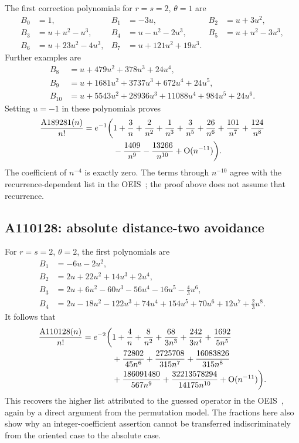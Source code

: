 \documentclass[11pt]{article}
\numberwithin{equation}{section}
\theoremstyle{definition}
\theoremstyle{remark}
\theoremstyle{definition}
\newcommand{\Aone}{\textnormal{A189281}}
\newcommand{\Atwo}{\textnormal{A110128}}
\newcommand{\bigO}{\mathrm O}
\begin{document}
The first correction polynomials for $r=s=2$, $\theta=1$ are
\begin{align}
 B_0&=1,& B_1&=-3u,& B_2&=u+3u^2,\\
 B_3&=u+u^2-u^3,&
 B_4&=u-u^2-2u^3,&
 B_5&=u+u^2-3u^3,\\
 B_6&=u+23u^2-4u^3,&
 B_7&=u+121u^2+19u^3.
\end{align}
Further examples are
\begin{align}
 B_8&=u+479u^2+378u^3+24u^4,\\
 B_9&=u+1681u^2+3737u^3+672u^4+24u^5,\\
 B_{10}&=u+5543u^2+28936u^3+11088u^4+984u^5+24u^6.
\end{align}
Setting $u=-1$ in these polynomials proves
\begin{equation}
 \begin{split}
 \frac{\Aone(n)}{n!}=e^{-1}\biggl(&1+\frac3n+\frac2{n^2}+\frac1{n^3}
 +\frac3{n^5}+\frac{26}{n^6}+\frac{101}{n^7}+\frac{124}{n^8}\\
 &-\frac{1409}{n^9}-\frac{13266}{n^{10}}+\bigO(n^{-11})\biggr).
 \end{split}
 \label{spf:eq:A189281}
\end{equation}
The coefficient of $n^{-4}$ is exactly zero. The terms through $n^{-10}$
agree with the recurrence-dependent list in the OEIS~\cite{oeis189281};
the proof above does not assume that recurrence.

\subsection{A110128: absolute distance-two avoidance}

For $r=s=2$, $\theta=2$, the first polynomials are
\begin{align}
 B_1&=-6u-2u^2,\\
 B_2&=2u+22u^2+14u^3+2u^4,\\
 B_3&=2u+6u^2-60u^3-56u^4-16u^5-\frac43u^6,\\
 B_4&=2u-18u^2-122u^3+74u^4+154u^5+70u^6+12u^7+\frac23u^8.
\end{align}
It follows that
\begin{equation}
 \begin{split}
 \frac{\Atwo(n)}{n!}=e^{-2}\biggl(&1+\frac4n+\frac8{n^2}
  +\frac{68}{3n^3}+\frac{242}{3n^4}+\frac{1692}{5n^5}\\
 &+\frac{72802}{45n^6}+\frac{2725708}{315n^7}
  +\frac{16083826}{315n^8}\\
 &+\frac{186091480}{567n^9}
  +\frac{32213578294}{14175n^{10}}
  +\bigO(n^{-11})\biggr).
 \end{split}
 \label{spf:eq:A110128}
\end{equation}
This recovers the higher list attributed to the guessed operator in the
OEIS~\cite{oeis110128}, again by a direct argument from the permutation model.
The fractions here also show why an integer-coefficient assertion cannot be
transferred indiscriminately from the oriented case to the absolute case.
\end{document}
